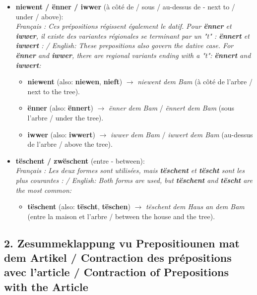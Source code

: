 \begin{itemize}
    \item \textbf{niewent / ënner / iwwer} (à côté de / sous / au-dessus de - next to / under / above): \\
    \textit{Français : Ces prépositions régissent également le datif. Pour \textbf{ënner} et \textbf{iwwer}, il existe des variantes régionales se terminant par un "t" : \textbf{ënnert} et \textbf{iwwert} : / English: These prepositions also govern the dative case. For \textbf{ënner} and \textbf{iwwer}, there are regional variants ending with a "t": \textbf{ënnert} and \textbf{iwwert}:}
    \begin{itemize}
        \item \textbf{niewent} (also: \textbf{niewen}, \textbf{nieft}) $\rightarrow$ \textit{niewent dem Bam} (à côté de l'arbre / next to the tree).
        \item \textbf{ënner} (also: \textbf{ënnert}) $\rightarrow$ \textit{ënner dem Bam} / \textit{ënnert dem Bam} (sous l'arbre / under the tree).
        \item \textbf{iwwer} (also: \textbf{iwwert}) $\rightarrow$ \textit{iwwer dem Bam} / \textit{iwwert dem Bam} (au-dessus de l'arbre / above the tree).
    \end{itemize}
    
    \item \textbf{tëschent / zwëschent} (entre - between): \\
    \textit{Français : Les deux formes sont utilisées, mais \textbf{tëschent} et \textbf{tëscht} sont les plus courantes : / English: Both forms are used, but \textbf{tëschent} and \textbf{tëscht} are the most common:}
    \begin{itemize}
        \item \textbf{tëschent} (also: \textbf{tëscht}, \textbf{tëschen}) $\rightarrow$ \textit{tëschent dem Haus an dem Bam} (entre la maison et l'arbre / between the house and the tree).
    \end{itemize}
\end{itemize}

\subsection*{2. Zesummeklappung vu Prepositiounen mat dem Artikel / Contraction des prépositions avec l'article / Contraction of Prepositions with the Article}

